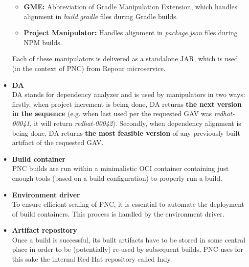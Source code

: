 \documentclass[../main.tex]{subfiles}
\begin{document}
\begin{itemize}
\begin{itemize}
        \item \textbf{GME:} Abbreviation of Gradle Manipulation Extension, which handles alignment in \textit{build.gradle} files during Gradle builds.

        \item \textbf{Project Manipulator:} Handles alignment in \textit{package.json} files during NPM builds.
    \end{itemize}

    Each of these manipulators is delivered as a standalone JAR, which is used (in the context of PNC) from Repour microservice.

    \item \textbf{DA}\\
    DA stands for dependency analyzer and is used by manipulators in two ways: firstly, when project increment is being done, DA returns \textbf{the next version in the sequence} (e.g. when last used per the requested GAV was \textit{redhat-00041}, it will return \textit{redhat-00042}). Secondly, when dependency alignment is being done, DA returns \textbf{the most feasible version} of any previously built artifact of the requested GAV.

    \item \textbf{Build container}\\
    PNC builds are run within a minimalistic OCI container containing just enough tools (based on a build configuration) to properly run a build.

    \item \textbf{Environment driver}\\
    To ensure efficient scaling of PNC, it is essential to automate the deployment of build containers. This process is handled by the environment driver.

    \item \textbf{Artifact repository}\\
    Once a build is successful, its built artifacts have to be stored in some central place in order to be (potentially) re-used by subsequent builds. PNC uses for this sake the internal Red Hat repository called Indy.

\end{itemize}
\end{document}
